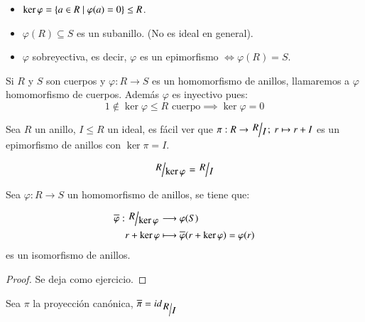 \begin{obs}$ $
    \begin{itemize}
        \item $\ker{\varphi} = \left\{a \in R \mid \varphi(a) = 0\right\} \leq R$.
        \item $\varphi(R) \subseteq S $ es un subanillo. (No es ideal en general).
        \item $\varphi$ sobreyectiva, es decir, $\varphi$ es un epimorfismo $\iff \varphi(R) = S$.
    \end{itemize}
\end{obs}

\begin{obs}
    Si $R$ y $S$ son cuerpos y $\varphi: R \to S$ es un homomorfismo de anillos, llamaremos a $\varphi$ homomorfismo de cuerpos. Además $\varphi$ es inyectivo pues:
    $$
        1 \notin \ker{\varphi} \leq R \text{ cuerpo} \implies \ker{\varphi} = 0
    $$
\end{obs}

\begin{eg}
    Sea $R$ un anillo, $I \leq R$ un ideal, es fácil ver que $\pi: R \to \quo{R}{I};\ r \mapsto r + I$ es un epimorfismo de anillos con $\ker{\pi} = I$.
\end{eg}

\begin{obs}
    $$\quo{R}{\ker{\varphi}} = \quo{R}{I}$$
\end{obs}

\begin{thm}\label{thm:1erisomorfia}
    Sea $\varphi: R \to S$ un homomorfismo de anillos, se tiene que:

    \begin{align*}
        \overline{\varphi}: \quo{R}{\ker \varphi} &\longrightarrow \varphi(S)\\
        r + \ker \varphi &\longmapsto \overline{\varphi}(r + \ker \varphi) = \varphi(r)
    \end{align*}
    es un isomorfismo de anillos.
\end{thm}

\begin{proof}
    Se deja como ejercicio.
\end{proof}

\begin{obs}
    Sea $\pi$ la proyección canónica, $\overline{\pi} = id_{\quo{R}{I}}$
\end{obs}


